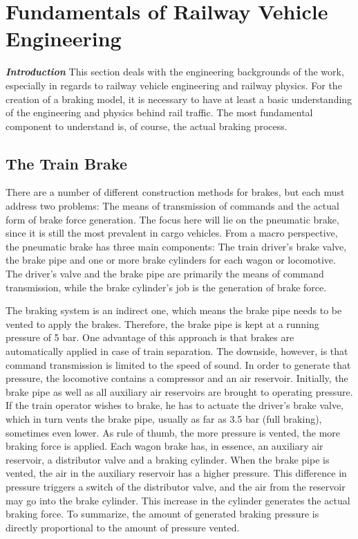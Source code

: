 \chapter{Fundamentals of Railway Vehicle Engineering}
\label{chap:FundamentalsOfRailwayVehicleEngineering}
\par\noindent
\textit{\textbf{Introduction}} This section deals with the engineering backgrounds of the work, especially in regards to railway vehicle engineering and railway physics. 
For the creation of a braking model, it is necessary to have at least a basic understanding of the engineering and physics behind rail traffic. The most fundamental component to understand is, of course, the actual braking process.

\section{The Train Brake}
\label{sec:TrainBrake}
\par\noindent
There are a number of different construction methods for brakes, but each must address two problems: The means of transmission of commands and the actual form of brake force generation. The focus here will lie on the pneumatic brake, since it is still the most prevalent in cargo vehicles. From a macro perspective, the pneumatic brake has three main components: The train driver's brake valve, the brake pipe and one or more brake cylinders for each wagon or locomotive. The driver's valve and the brake pipe are primarily the means of command transmission, while the brake cylinder's job is the generation of brake force. 

\par
The braking system is an indirect one, which means the brake pipe needs to be vented to apply the brakes. Therefore, the brake pipe is kept at a running pressure of 5 bar. One advantage of this approach is that brakes are automatically applied in case of train separation. The downside, however, is that command transmission is limited to the speed of sound. In order to generate that pressure, the locomotive contains a compressor and an air reservoir. Initially, the brake pipe as well as all auxiliary air reservoirs are brought to operating pressure. If the train operator wishes to brake, he has to actuate the driver's brake valve, which in turn vents the brake pipe, usually as far as 3.5 bar (full braking), sometimes even lower. As rule of thumb, the more pressure is vented, the more braking force is applied. Each wagon brake has, in essence, an auxiliary air reservoir, a distributor valve and a braking cylinder. When the brake pipe is vented, the air in the auxiliary reservoir has a higher pressure. This difference in pressure triggers a switch of the distributor valve, and the air from the reservoir may go into the brake cylinder. This increase in the cylinder generates the actual braking force. To summarize, the amount of generated braking pressure is directly proportional to the amount of pressure vented.

